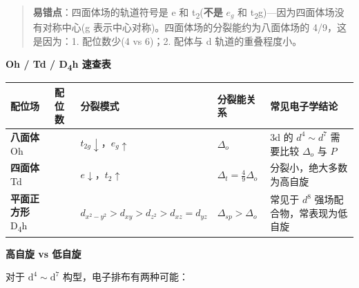 \begin{quote}
\textbf{易错点}：四面体场的轨道符号是 e 和 t\textsubscript{2}(\textbf{不是} \(e_g\) 和 t\textsubscript{2}g)---因为四面体场没有对称中心(g 表示中心对称)。四面体场的分裂能约为八面体场的 4/9，这是因为：1. 配位数少(4 vs 6)；2. 配体与 d 轨道的重叠程度小。
\end{quote}

\textbf{Oh / Td / D\textsubscript{4}h 速查表}

{\def\LTcaptype{none} %
\begin{longtable}[]{@{}
  >{\centering\arraybackslash}p{}
  >{\centering\arraybackslash}p{}
  >{\raggedright\arraybackslash}p{}
  >{\centering\arraybackslash}p{}
  >{\raggedright\arraybackslash}p{}@{}}
\toprule\noalign{}
\begin{minipage}[b]{\linewidth}\centering
配位场
\end{minipage} & \begin{minipage}[b]{\linewidth}\centering
配位数
\end{minipage} & \begin{minipage}[b]{\linewidth}\raggedright
分裂模式
\end{minipage} & \begin{minipage}[b]{\linewidth}\centering
分裂能关系
\end{minipage} & \begin{minipage}[b]{\linewidth}\raggedright
常见电子学结论
\end{minipage} \\
\midrule\noalign{}
\endhead
\bottomrule\noalign{}
\endlastfoot
\textbf{八面体} Oh & 6 & \(t_{2g} \downarrow\)，\(e_g \uparrow\) & \(\Delta_o\) & 3d 的 \(d^4 \sim d^7\) 需要比较 \(\Delta_o\) 与 \(P\) \\
\textbf{四面体} Td & 4 & \(e \downarrow\)，\(t_2 \uparrow\) & \(\Delta_t = \frac{4}{9}\Delta_o\) & 分裂小，绝大多数为高自旋 \\
\textbf{平面正方形} D\textsubscript{4}h & 4 & \(d_{x^2-y^2} > d_{xy} > d_{z^2} > d_{xz}=d_{yz}\) & \(\Delta_{sp} > \Delta_o\) & 常见于 \(d^8\) 强场配合物，常表现为低自旋 \\
\end{longtable}
}

\textbf{高自旋 vs 低自旋}

对于 \(\mathrm{d^4 \sim d^7}\) 构型，电子排布有两种可能：

